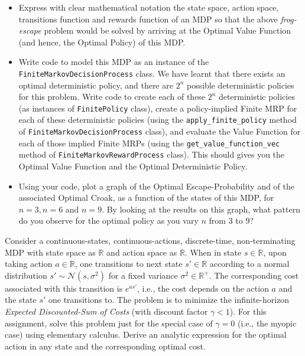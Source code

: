 \documentclass[12pt]{exam}
\begin{document}
\begin{questions}
\begin{itemize}
\item Express with clear mathematical notation the state space, action space, transitions function and rewards function of an MDP so that the above {\em frog-escape} problem would be solved by arriving at the Optimal Value Function (and hence, the Optimal Policy) of this MDP.
\item Write code to model this MDP as an instance of the \lstinline{FiniteMarkovDecisionProcess} class. We have learnt that there exists an optimal deterministic policy, and there are $2^n$ possible deterministic policies for this problem. Write code to create each of these $2^n$ deterministic policies (as instances of \lstinline{FinitePolicy} class), create a policy-implied Finite MRP for each of these deterministic policies (using the \lstinline{apply_finite_policy} method of \lstinline{FiniteMarkovDecisionProcess} class), and evaluate the Value Function for each of those implied Finite MRPs (using the \lstinline{get_value_function_vec} method of \lstinline{FiniteMarkovRewardProcess} class). This should gives you the Optimal Value Function and the Optimal Deterministic Policy.
\item Using your code, plot a graph of the Optimal Escape-Probability and of the associated Optimal Croak, as a function of the states of this MDP, for $n=3, n=6$ and $n=9$. By looking at the results on this graph, what pattern do you observe for the optimal policy as you vary $n$ from 3 to 9? 
\end{itemize}

\question Consider a continuous-states, continuous-actions, discrete-time, non-terminating MDP with state space as $\mathbb{R}$ and action space as $\mathbb{R}$. When in state $s\in \mathbb{R}$, upon taking action $a\in \mathbb{R}$, one transitions to next state $s' \in \mathbb{R}$ according to a normal distribution $s' \sim \mathcal{N}(s, \sigma^2)$ for a fixed variance $\sigma^2 \in \mathbb{R}^+$. The corresponding cost associated with this transition is $e^{as'}$, i.e., the cost depends on the action $a$ and the state $s'$ one transitions to. The problem is to minimize the infinite-horizon {\em Expected Discounted-Sum of Costs} (with discount factor $\gamma < 1$). For this assignment, solve this problem just for the special case of $\gamma = 0$ (i.e., the myopic case) using elementary calculus. Derive an analytic expression for the optimal action in any state and the corresponding optimal cost.

\end{questions}
\end{document}
